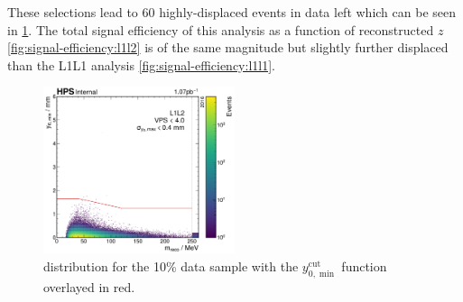 These selections lead to 60
highly-displaced events in data left which can be seen in \cref{fig:y0-cut-on-data}.
The total signal efficiency of this analysis as a function of reconstructed $z$
\cref{fig:signal-efficiency:l1l2} is of the same magnitude but slightly further displaced
than the L1L1 analysis \cref{fig:signal-efficiency:l1l1}.

\begin{figure}
  \centering
  \includegraphics[width=0.5\textwidth]{figures/hps/analysis/results/y0-cut-on-data.pdf}
  \caption{\minyzero distribution for the 10\% data sample with the
  $y_{0,\min}^\mathrm{cut}$ function overlayed in red.}
  \label{fig:y0-cut-on-data}
\end{figure}

